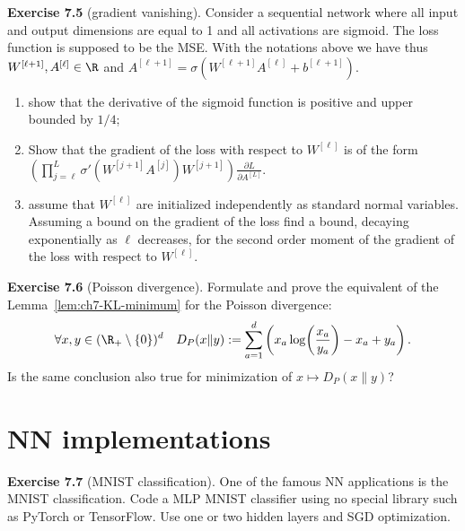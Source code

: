 \begin{tcolorbox}[remarkbox]
\textbf{Exercise 7.5} (gradient vanishing). Consider a sequential network where all input and output dimensions are equal to 1 and all activations are sigmoid. The loss function is supposed to be the MSE. With the notations above we have thus $W^{[\ell+1]}, A^{[\ell]} \in \R$ and $A^{[\ell+1]} = \sigma(W^{[\ell+1]} A^{[\ell]} + b^{[\ell+1]})$.
\begin{enumerate}
  \item show that the derivative of the sigmoid function is positive and upper bounded by $1/4$;
  \item Show that the gradient of the loss with respect to $W^{[\ell]}$ is of the form $\left( \prod_{j=\ell}^{L} \sigma'(W^{[j+1]} A^{[j]}) W^{[j+1]} \right) \frac{\partial L}{\partial A^{[L]}}$.
  \item assume that $W^{[\ell]}$ are initialized independently as standard normal variables. Assuming a bound on the gradient of the loss find a bound, decaying exponentially as $\ell$ decreases, for the second order moment of the gradient of the loss with respect to $W^{[\ell]}$.
\end{enumerate}
\end{tcolorbox}

\begin{tcolorbox}[remarkbox]
\textbf{Exercise 7.6} (Poisson divergence). Formulate and prove the equivalent of the Lemma~\ref{lem:ch7-KL-minimum} for the Poisson divergence:
\begin{equation}\label{eq:ch7-poisson-div}
  \forall x, y \in (\R_+ \setminus \{0\})^d \quad D_P(x \| y) := \sum_{a=1}^{d} \left( x_a \log\!\left( \frac{x_a}{y_a} \right) - x_a + y_a \right).
\end{equation}
Is the same conclusion also true for minimization of $x \mapsto D_P(x \| y)$?
\end{tcolorbox}

\section{NN implementations}

\begin{tcolorbox}[remarkbox]
\textbf{Exercise 7.7} (MNIST classification). One of the famous NN applications is the MNIST classification. Code a MLP MNIST classifier using no special library such as PyTorch or TensorFlow. Use one or two hidden layers and SGD optimization.
\end{tcolorbox}


